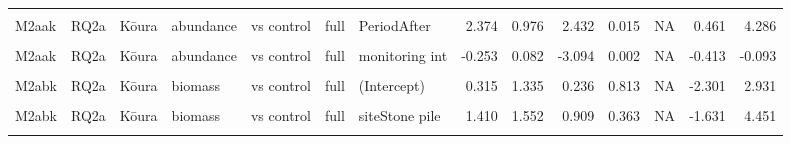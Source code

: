 \documentclass[
  12pt,
  a4paper,
  oneside]{scrbook}
\begin{document}
\begin{landscape}
\begin{longtable}[t]{lllllllrrrrrrr}
\cellcolor{gray!8}{M2aak} & \cellcolor{gray!8}{RQ2a} & \cellcolor{gray!8}{Kōura} & \cellcolor{gray!8}{abundance} & \cellcolor{gray!8}{vs control} & \cellcolor{gray!8}{full} & \cellcolor{gray!8}{(Intercept)} & \cellcolor{gray!8}{-2.753} & \cellcolor{gray!8}{1.183} & \cellcolor{gray!8}{-2.327} & \cellcolor{gray!8}{0.020} & \cellcolor{gray!8}{NA} & \cellcolor{gray!8}{-5.072} & \cellcolor{gray!8}{-0.434}\\
M2aak & RQ2a & Kōura & abundance & vs control & full & PeriodAfter & 2.374 & 0.976 & 2.432 & 0.015 & NA & 0.461 & 4.286\\
\cellcolor{gray!8}{M2aak} & \cellcolor{gray!8}{RQ2a} & \cellcolor{gray!8}{Kōura} & \cellcolor{gray!8}{abundance} & \cellcolor{gray!8}{vs control} & \cellcolor{gray!8}{full} & \cellcolor{gray!8}{siteStone pile} & \cellcolor{gray!8}{0.751} & \cellcolor{gray!8}{1.335} & \cellcolor{gray!8}{0.563} & \cellcolor{gray!8}{0.574} & \cellcolor{gray!8}{NA} & \cellcolor{gray!8}{-1.865} & \cellcolor{gray!8}{3.368}\\
M2aak & RQ2a & Kōura & abundance & vs control & full & monitoring int & -0.253 & 0.082 & -3.094 & 0.002 & NA & -0.413 & -0.093\\
\addlinespace
\cellcolor{gray!8}{M2aak} & \cellcolor{gray!8}{RQ2a} & \cellcolor{gray!8}{Kōura} & \cellcolor{gray!8}{abundance} & \cellcolor{gray!8}{vs control} & \cellcolor{gray!8}{full} & \cellcolor{gray!8}{PeriodAfter:siteStone pile} & \cellcolor{gray!8}{0.311} & \cellcolor{gray!8}{1.232} & \cellcolor{gray!8}{0.253} & \cellcolor{gray!8}{0.800} & \cellcolor{gray!8}{0.858} & \cellcolor{gray!8}{-2.104} & \cellcolor{gray!8}{2.727}\\
M2abk & RQ2a & Kōura & biomass & vs control & full & (Intercept) & 0.315 & 1.335 & 0.236 & 0.813 & NA & -2.301 & 2.931\\
\cellcolor{gray!8}{M2abk} & \cellcolor{gray!8}{RQ2a} & \cellcolor{gray!8}{Kōura} & \cellcolor{gray!8}{biomass} & \cellcolor{gray!8}{vs control} & \cellcolor{gray!8}{full} & \cellcolor{gray!8}{PeriodAfter} & \cellcolor{gray!8}{2.248} & \cellcolor{gray!8}{1.246} & \cellcolor{gray!8}{1.805} & \cellcolor{gray!8}{0.071} & \cellcolor{gray!8}{NA} & \cellcolor{gray!8}{-0.193} & \cellcolor{gray!8}{4.689}\\
M2abk & RQ2a & Kōura & biomass & vs control & full & siteStone pile & 1.410 & 1.552 & 0.909 & 0.363 & NA & -1.631 & 4.451\\
\cellcolor{gray!8}{M2abk} & \cellcolor{gray!8}{RQ2a} & \cellcolor{gray!8}{Kōura} & \cellcolor{gray!8}{biomass} & \cellcolor{gray!8}{vs control} & \cellcolor{gray!8}{full} & \cellcolor{gray!8}{monitoring int} & \cellcolor{gray!8}{-0.196} & \cellcolor{gray!8}{0.110} & \cellcolor{gray!8}{-1.791} & \cellcolor{gray!8}{0.073} & \cellcolor{gray!8}{NA} & \cellcolor{gray!8}{-0.412} & \cellcolor{gray!8}{0.019}\\

\end{longtable}
\end{landscape}
\end{document}
